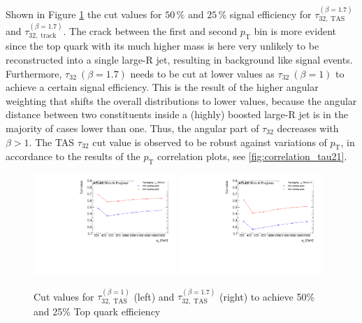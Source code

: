 Shown in Figure \ref{fig:top_cut} the cut values for $50\,\%$ and $25\,\%$ signal efficiency for $\tau_{32,\;\text{TAS}}^{(\beta=1.7)}$ and $\tau_{32,\;\text{track}}^{(\beta=1.7)}$. The crack between the first and second $p_{\mathrm{T}}$ bin is more evident since the top quark with its much higher mass is here very unlikely to be reconstructed into a single large-R jet, resulting in background like signal events. Furthermore, $\tau_{32} \: (\beta=1.7)$ needs to be cut at lower values as $\tau_{32}\: (\beta=1)$ to achieve a certain signal efficiency. This is the result of the higher angular weighting that shifts the overall distributions to lower values, because the angular distance between two constituents inside a (highly) boosted large-R jet is in the majority of cases lower than one. Thus, the angular part of $\tau_{32}$ decreases with $\beta > 1$. The TAS $\tau_{32}$ cut value is observed to be robust against variations of $p_{\mathrm{T}}$, in accordance to the results of the $p_{\mathrm{T}}$ correlation plots, see \ref{fig:correlation_tau21}.
\begin{figure}[htp]
\includegraphics[width=0.48\textwidth]{sascha_input/plots/Top/cut_values/tau32_tas1.pdf} \hspace{1mm}
\includegraphics[width=0.48\textwidth]{sascha_input/plots/Top/cut_values/tau32_tas17.pdf}
\caption{{Cut values for $\tau_{32,\;\text{TAS}}^{(\beta=1)}$ (left) and $\tau_{32,\;\text{TAS}}^{(\beta=1.7)}$ (right) to achieve 50\% and 25\% Top quark efficiency}}\label{fig:top_cut}
\end{figure}

